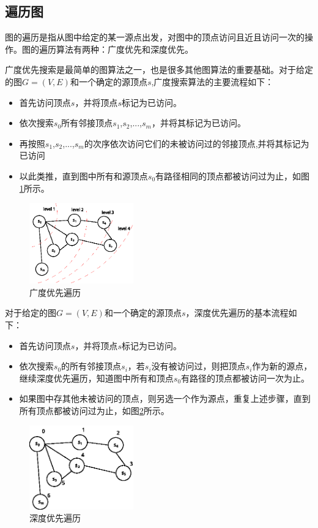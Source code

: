 \subsection{遍历图}
图的遍历是指从图中给定的某一源点出发，对图中的顶点访问且近且访问一次的操作。图的遍历算法有两种：广度优先和深度优先。

广度优先搜索是最简单的图算法之一，也是很多其他图算法的重要基础。对于给定的图$G=(V,E)$和一个确定的源顶点$s$,广度搜索算法的主要流程如下：
\begin{itemize}
\item 首先访问顶点$s$，并将顶点$s$标记为已访问。
\item 依次搜索$s_0$所有邻接顶点$s_1$,$s_2$,...,$s_m$，并将其标记为已访问。
\item 再按照$s_1$,$s_2$,...,$s_m$的次序依次访问它们的未被访问过的邻接顶点,并将其标记为已访问
\item 以此类推，直到图中所有和源顶点$s_0$有路径相同的顶点都被访问过为止，如图\ref{fig:graphbfs}所示。
\end{itemize}

\begin{figure}[htbp]
\centering
\includegraphics[width=0.4\textwidth]{myfigures/graphbfs}
\caption{广度优先遍历}\label{fig:graphbfs}
\vspace{\baselineskip}
\end{figure}

对于给定的图$G=(V,E)$和一个确定的源顶点$s$，深度优先遍历的基本流程如下：
\begin{itemize}
\item 首先访问顶点$s$，并将顶点$s$标记为已访问。
\item 依次搜索$s_0$的所有邻接顶点$s_i$，若$s_i$没有被访问过，则把顶点$s_i$作为新的源点，继续深度优先遍历，知道图中所有和顶点$s_0$有路径的顶点都被访问一次为止。
\item 如果图中存其他未被访问的顶点，则另选一个作为源点，重复上述步骤，直到所有顶点都被访问过为止，如图\ref{fig:graphdfs}所示。
\end{itemize}

\begin{figure}[htbp]
\centering
\includegraphics[width=0.4\textwidth]{myfigures/graphdfs}
\caption{深度优先遍历}\label{fig:graphdfs}
\vspace{\baselineskip}
\end{figure}

